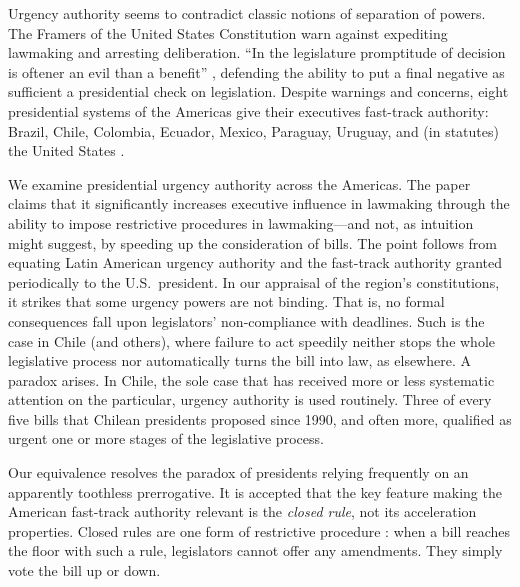 \documentclass[letter,12pt]{article}
\begin{document}
Urgency authority seems to contradict classic notions of separation of powers. The Framers of the United States Constitution warn against expediting lawmaking and arresting deliberation. ``In the legislature promptitude of decision is oftener an evil than a benefit'' \citep{hamilton70.1788}, defending the ability to put a final negative as sufficient a presidential check on legislation. Despite warnings and concerns, eight presidential systems of the Americas give their executives fast-track authority: Brazil, Chile, Colombia, Ecuador, Mexico, Paraguay, Uruguay, and (in statutes) the United States \citep{morgenstern.nacif.2002,garcia.montero.presidentes.2009}.

We examine presidential urgency authority across the Americas. The paper claims that it significantly increases executive influence in lawmaking through the ability to impose restrictive procedures in lawmaking---and not, as intuition might suggest, by speeding up the consideration of bills. The point follows from equating Latin American urgency authority and the fast-track authority granted periodically to the U.S.\ president. In our appraisal of the region's constitutions, it strikes that some urgency powers are not binding. That is, no formal consequences fall upon legislators' non-compliance with deadlines. Such is the case in Chile (and others), where failure to act speedily neither stops the whole legislative process nor automatically turns the bill into law, as elsewhere. A paradox arises. In Chile, the sole case that has received more or less systematic attention on the particular, urgency authority is used routinely. Three of every five bills that Chilean presidents proposed since 1990, and often more, qualified as urgent one or more stages of the legislative process.

Our equivalence resolves the paradox of presidents relying frequently on an apparently toothless prerrogative. It is accepted that the key feature making the American fast-track authority relevant is the \emph{closed rule}, not its acceleration properties. Closed rules are one form of restrictive procedure \citep{oleszek.2001}: when a bill reaches the floor with such a rule, legislators cannot offer any amendments. They simply vote the bill up or down. 
\end{document}
